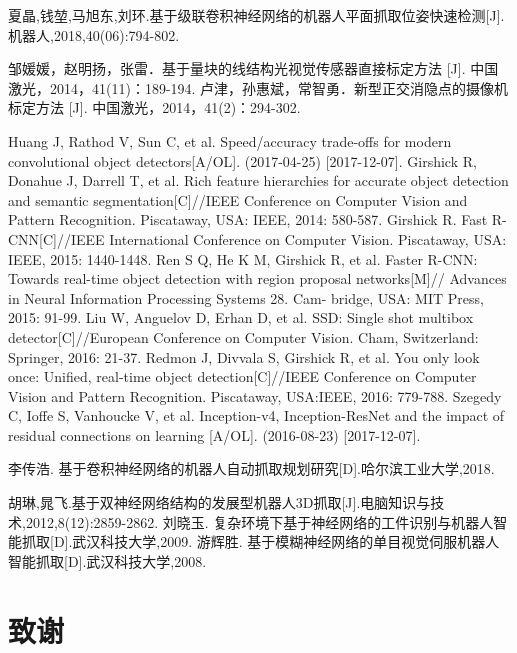 \documentclass{hitszthesis}
\begin{document}
\begin{thebibliography}{99}
  夏晶,钱堃,马旭东,刘环.基于级联卷积神经网络的机器人平面抓取位姿快速检测[J].机器人,2018,40(06):794-802.
 
 邹媛媛，赵明扬，张雷．基于量块的线结构光视觉传感器直接标定方法 [J]. 中国激光，2014，41(11)：189-194.
 卢津，孙惠斌，常智勇．新型正交消隐点的摄像机标定方法 [J]. 中国激光，2014，41(2)：294-302.

 Huang J, Rathod V, Sun C, et al. Speed/accuracy trade-offs for modern convolutional object detectors[A/OL]. (2017-04-25) [2017-12-07].    
 Girshick R, Donahue J, Darrell T, et al. Rich feature hierarchies for accurate object detection and semantic segmentation[C]//IEEE Conference on Computer Vision and Pattern Recognition. Piscataway, USA: IEEE, 2014: 580-587.
 Girshick R. Fast R-CNN[C]//IEEE International Conference on Computer Vision. Piscataway, USA: IEEE, 2015: 1440-1448.
 Ren S Q, He K M, Girshick R, et al. Faster R-CNN: Towards real-time object detection with region proposal networks[M]// Advances in Neural Information Processing Systems 28. Cam- bridge, USA: MIT Press, 2015: 91-99.
 Liu W, Anguelov D, Erhan D, et al. SSD: Single shot multibox detector[C]//European Conference on Computer Vision. Cham, Switzerland: Springer, 2016: 21-37.
 Redmon J, Divvala S, Girshick R, et al. You only look once: Unified, real-time object detection[C]//IEEE Conference on Computer Vision and Pattern Recognition. Piscataway, USA:IEEE, 2016: 779-788.
 Szegedy C, Ioffe S, Vanhoucke V, et al. Inception-v4, Inception-ResNet and the impact of residual connections on learning [A/OL]. (2016-08-23) [2017-12-07].

 李传浩. 基于卷积神经网络的机器人自动抓取规划研究[D].哈尔滨工业大学,2018.
 
  胡琳,晁飞.基于双神经网络结构的发展型机器人3D抓取[J].电脑知识与技术,2012,8(12):2859-2862.
 刘晓玉. 复杂环境下基于神经网络的工件识别与机器人智能抓取[D].武汉科技大学,2009.
 游辉胜. 基于模糊神经网络的单目视觉伺服机器人智能抓取[D].武汉科技大学,2008.
\end{thebibliography}

\declaration

\chapter*{致\quad 谢}
\end{document}
